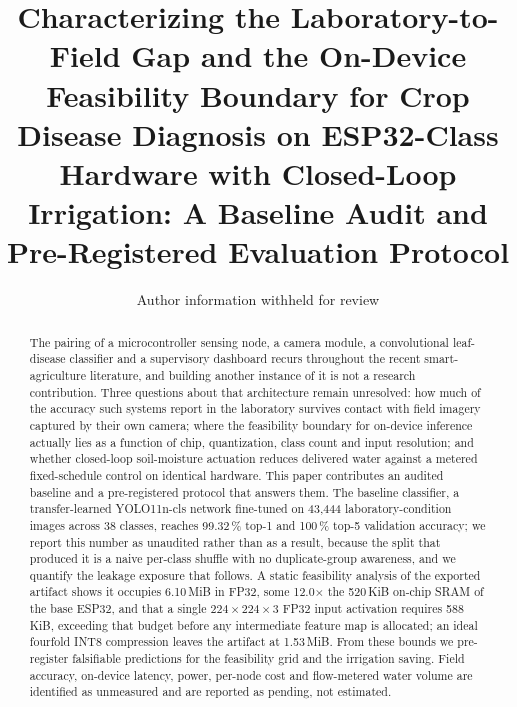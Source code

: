 \documentclass[journal]{IEEEtran}
\begin{document}
\title{Characterizing the Laboratory-to-Field Gap and the On-Device
Feasibility Boundary for Crop Disease Diagnosis on ESP32-Class Hardware
with Closed-Loop Irrigation: A Baseline Audit and Pre-Registered
Evaluation Protocol}

\author{Author information withheld for review}


\maketitle

\begin{abstract}
The pairing of a microcontroller sensing node, a camera module, a
convolutional leaf-disease classifier and a supervisory dashboard recurs
throughout the recent smart-agriculture literature, and building another
instance of it is not a research contribution. Three questions about that
architecture remain unresolved: how much of the accuracy such systems
report in the laboratory survives contact with field imagery captured by
their own camera; where the feasibility boundary for on-device inference
actually lies as a function of chip, quantization, class count and input
resolution; and whether closed-loop soil-moisture actuation reduces
delivered water against a metered fixed-schedule control on identical
hardware. This paper contributes an audited baseline and a pre-registered
protocol that answers them. The baseline classifier, a transfer-learned
YOLO11n-cls network fine-tuned on 43{,}444 laboratory-condition images
across 38 classes, reaches 99.32\,\% top-1 and 100\,\% top-5 validation
accuracy; we report this number as unaudited rather than as a result,
because the split that produced it is a naive per-class shuffle with no
duplicate-group awareness, and we quantify the leakage exposure that
follows. A static feasibility analysis of the exported artifact shows it
occupies 6.10\,MiB in FP32, some 12.0$\times$ the 520\,KiB on-chip SRAM of
the base ESP32, and that a single $224\times224\times3$ FP32 input
activation requires 588\,KiB, exceeding that budget before any intermediate
feature map is allocated; an ideal fourfold INT8 compression leaves the
artifact at 1.53\,MiB. From these bounds we pre-register falsifiable
predictions for the feasibility grid and the irrigation saving. Field
accuracy, on-device latency, power, per-node cost and flow-metered water
volume are identified as unmeasured and are reported as pending, not
estimated.
\end{abstract}
\end{document}
